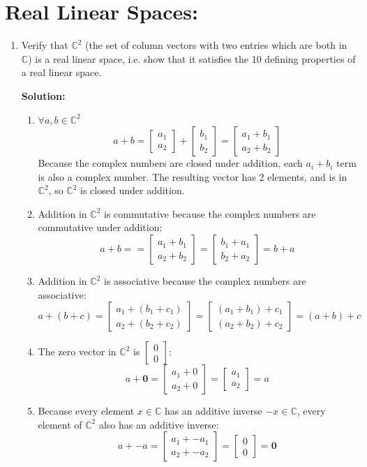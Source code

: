 \documentclass[]{article}
\newcommand{\C}{\mathbb{C}}
\newcommand{\bbm}{\begin{bmatrix}}
\newcommand{\ebm}{\end{bmatrix}}
\newcommand{\solution}{\vskip 0.5cm \textbf{\large Solution:} \\}
\begin{document}
    \section*{Real Linear Spaces:}

    \begin{enumerate}[resume]
	\item Verify that $\mathbb{C}^2$ (the set of column vectors with two entries which are both in $\mathbb{C}$) is a real linear space, i.e. show that it satisfies the 10 defining properties of a real linear space.

	  \solution
      \begin{enumerate}
      \item $\forall a,b \in \C^2$
        \[
        a + b = \bbm a_1 \\ a_2 \ebm + \bbm b_1 \\ b_2 \ebm = \bbm a_1 + b_1 \\ a_2 + b_2 \ebm
        \]
        Because the complex numbers are closed under addition, each
        $a_i + b_i$ term is also a complex number. The resulting
        vector has 2 elements, and is in $\C^2$, so $\C^2$ is closed
        under addition.
      \item Addition in $\C^2$ is commutative because the complex
        numbers are commutative under addition:
        \[
        a + b = = \bbm a_1 + b_1 \\ a_2 + b_2 \ebm = \bbm b_1 + a_1 \\ b_2 + a_2 \ebm = b + a
        \]
      \item Addition in $\C^2$ is associative because the complex
        numbers are associative:
        \[
        a + (b + c) = \bbm a_1 + (b_1 + c_1) \\ a_2 + (b_2 + c_2) \ebm = \bbm (a_1 + b_1) + c_1 \\ (a_2 + b_2) + c_2 \ebm = (a + b) + c
        \]
      \item The zero vector in $\C^2$ is $\bbm 0 \\ 0 \ebm$:
        \[
        a + \bm{0} = \bbm a_1 + 0 \\ a_2 + 0 \ebm  = \bbm a_1 \\ a_2 \ebm = a
        \]
      \item Because every element $x \in \C$ has an additive inverse
        $-x \in \C$, every element of $\C^2$ also has an additive
        inverse:
        \[
        a + -a = \bbm a_1 + -a_1 \\ a_2 + -a_2 \ebm = \bbm 0 \\ 0 \ebm = \bm{0}
\]
\end{enumerate}
\end{enumerate}
\end{document}
